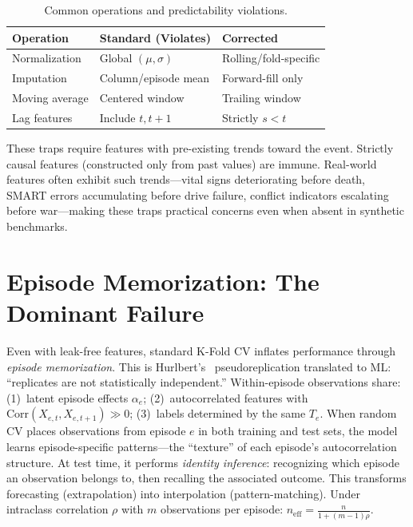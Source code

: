 \documentclass[acmsmall,nonacm]{acmart}
\newcommand{\1}{\mathbbm{1}}
\begin{document}
\begin{table}[t]
\centering
\caption{Common operations and predictability violations.}\label{tab:violations}
\vspace{-2mm}
\begin{tabular}{@{}lll@{}}
\toprule
Operation & Standard (Violates) & Corrected \\
\midrule
Normalization & Global $(\mu,\sigma)$ & Rolling/fold-specific \\
Imputation & Column/episode mean & Forward-fill only \\
Moving average & Centered window & Trailing window \\
Lag features & Include $t, t{+}1$ & Strictly $s < t$ \\
\bottomrule
\end{tabular}
\vspace{-3mm}
\end{table}

These traps require features with pre-existing trends toward the event. Strictly causal features (constructed only from past values) are immune. Real-world features often exhibit such trends---vital signs deteriorating before death, SMART errors accumulating before drive failure, conflict indicators escalating before war---making these traps practical concerns even when absent in synthetic benchmarks.

\section{Episode Memorization: The Dominant Failure}\label{sec:pseudo}

Even with leak-free features, standard K-Fold CV inflates performance through \emph{episode memorization}. This is Hurlbert's~\cite{hurlbert1984} pseudoreplication translated to ML: ``replicates are not statistically independent.'' Within-episode observations share: (1)~latent episode effects $\alpha_e$; (2)~autocorrelated features with $\text{Corr}(X_{e,t}, X_{e,t+1}) \gg 0$; (3)~labels determined by the same $T_e$. When random CV places observations from episode $e$ in both training and test sets, the model learns episode-specific patterns---the ``texture'' of each episode's autocorrelation structure. At test time, it performs \textit{identity inference}: recognizing which episode an observation belongs to, then recalling the associated outcome. This transforms forecasting (extrapolation) into interpolation (pattern-matching). Under intraclass correlation $\rho$ with $m$ observations per episode:
$n_{\text{eff}} = \frac{n}{1 + (m-1)\rho}$.
\end{document}
